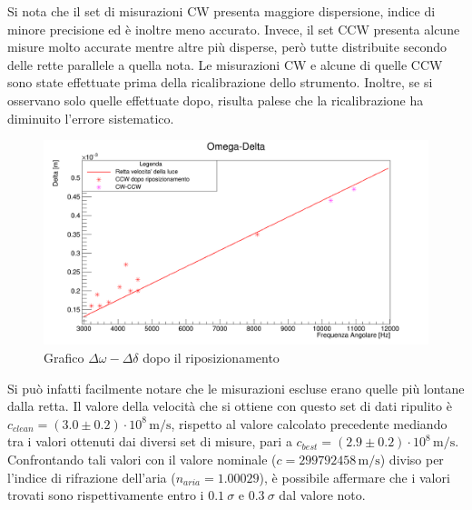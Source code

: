 \documentclass{article}
\begin{document}
        Si nota che il set di misurazioni CW presenta maggiore dispersione, indice di minore precisione ed è inoltre meno accurato. 
        Invece, il set CCW presenta alcune misure molto accurate mentre altre più disperse, però tutte distribuite secondo delle rette parallele a quella nota. 
        Le misurazioni CW e alcune di quelle CCW sono state effettuate prima della ricalibrazione dello strumento. 
        Inoltre, se si osservano solo quelle effettuate dopo, risulta palese che la ricalibrazione ha diminuito l'errore sistematico.

        \begin{figure}[H]

            \centering
            \includegraphics[scale=0.32]{../images/omega_delta2.png}
            \caption{Grafico $\Delta\omega-\Delta\delta$ dopo il riposizionamento}
            \label{fig:Omega-Delta2}

        \end{figure}

        Si può infatti facilmente notare che le misurazioni escluse erano quelle più lontane dalla retta. 
        Il valore della velocità che si ottiene con questo set di dati ripulito è 
        $c_{clean} = (3.0 \pm 0.2) \cdot 10^8\, \mathrm{m/s}$, rispetto al valore calcolato precedente mediando tra i valori ottenuti dai diversi set di misure, 
        pari a $c_{best} = (2.9 \pm 0.2)\cdot10^8\, \mathrm{m/s.}$
        Confrontando tali valori con il valore nominale ($ c = 299 792 458\, \mathrm{m/s}$) diviso per l'indice di rifrazione dell'aria ($n_{aria} = 1.00029$), 
        è possibile affermare che i valori trovati sono rispettivamente entro i $0.1~\sigma$ e  $0.3~\sigma$ dal valore noto.
\end{document}
